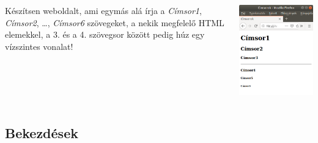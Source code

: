 \documentclass[usenames,dvipsnames,aspectratio=169]{beamer}
\begin{document}
\begin{frame}
  \begin{columns}[c]
      Készítsen weboldalt, ami egymás alá írja a \emph{Címsor1}, \emph{Címsor2}, \dots, \emph{Címsor6} szövegeket, a nekik megfelelő HTML elemekkel, a 3. és a 4. szövegsor között pedig húz egy vízszintes vonalat!
      \begin{exampleblock}{}
        \begin{center}
          \includegraphics[scale=.25]{cimsorok.png}
        \end{center}
      \end{exampleblock}
  \end{columns}
\end{frame}

\subsection{Bekezdések}
\end{document}
